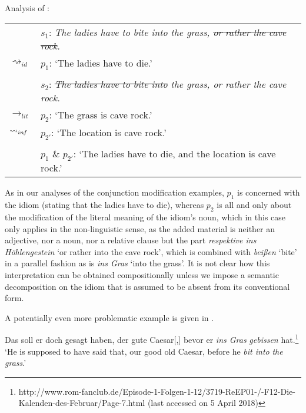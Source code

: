\documentclass[output=paper]{langsci/langscibook}
\begin{document}
\ea \label{analysis cave rock} 
Analysis of : \\
\vspace{5pt}
\begin{tabular}{ll}
								& 	$s_{1}$: \hspace{4pt} \textit{The ladies have to bite into the grass, \sout{or rather the cave rock}.} \\
$\rightsquigarrow_{id}$				&	$p_{1}$: \hspace{1pt} `The ladies have to die.' \\
\vspace{-5pt} \\
								& 	$s_{2}$: \hspace{4pt} \textit{\sout{The ladies have to bite into} the grass, or rather the cave rock.} \\
$\rightarrow_{lit}$					&	$p_{2}$: \hspace{1pt} `The grass is cave rock.' \\
$\rightsquigarrow_{in\hspace{-0.8pt} f}$	&	$p_{2'}$: \hspace{-1.5pt} `The location is cave rock.' \\
\vspace{-5pt} \\
								&	$p_{1}$ \& $p_{2'}$: `The ladies have to die, and the location is cave rock.' 
\end{tabular}
\z

\noindent As in our analyses of the conjunction modification examples, $p_{1}$ is concerned with the idiom (stating that the ladies have to die), whereas $p_{2}$ is all and only about the modification of the literal meaning of the idiom's noun, which in this case only applies in the non-linguistic sense, as the added material is neither an adjective, nor a noun, nor a relative clause but the part \textit{respektive ins H\"ohlengestein} `or rather into the cave rock', which is combined with \textit{beißen} `bite' in a parallel fashion as is \textit{ins Gras} `into the grass'. It is not clear how this interpretation can be obtained compositionally unless we impose a semantic decomposition on the idiom that is assumed to be absent from its conventional form.

A potentially even more problematic example is given in .

\ea \label{marble floor}
Das soll er doch gesagt haben, der gute Caesar[,] bevor er \underline{} \textit{ins Gras} \underline{} \textit{gebissen} hat.\footnote{http://www.rom-fanclub.de/Episode-1-Folgen-1-12/3719-ReEP01-/-F12-Die-Kalenden-des-Februar/Page-7.html (last accessed on 5 April 2018)}
\vspace{5pt}
\glt `He is supposed to have said that, our good old Caesar, before he \textit{bit into} \underline{} \textit{the grass}.' 
\z
\end{document}
